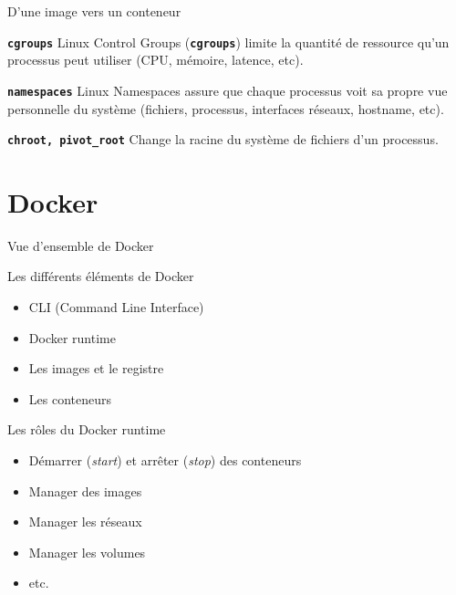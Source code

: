 \documentclass[aspectratio=169,10pt]{beamer}
\begin{document}
\begin{frame}{D'une image vers un conteneur}


\begin{block}{\texttt{\textbf{cgroups}}}
Linux Control Groups (\texttt{\textbf{cgroups}}) limite la quantité de ressource qu'un processus peut utiliser (CPU, mémoire, latence, etc).
\end{block}

\begin{block}{\texttt{\textbf{namespaces}}}
Linux Namespaces assure que chaque processus voit sa propre vue personnelle du système (fichiers, processus, interfaces réseaux, hostname, etc).
\end{block}

\begin{block}{\texttt{\textbf{chroot, pivot\_root}}}
Change la racine du système de fichiers d'un processus.   
\end{block}

\end{frame}

\section{Docker}

\begin{frame}{Vue d'ensemble de Docker}

Les différents éléments de Docker

\begin{itemize}
    \item CLI (Command Line Interface)
    \item Docker runtime
    \item Les images et le registre
    \item Les conteneurs
\end{itemize}

\begin{alertblock}{Les rôles du Docker runtime}
    \begin{itemize}
    \item Démarrer (\emph{start}) et arrêter (\emph{stop}) des conteneurs 
    \item Manager des images
    \item Manager les réseaux
    \item Manager les volumes
    \item etc.
\end{itemize}
\end{alertblock}

\end{frame}
\end{document}
